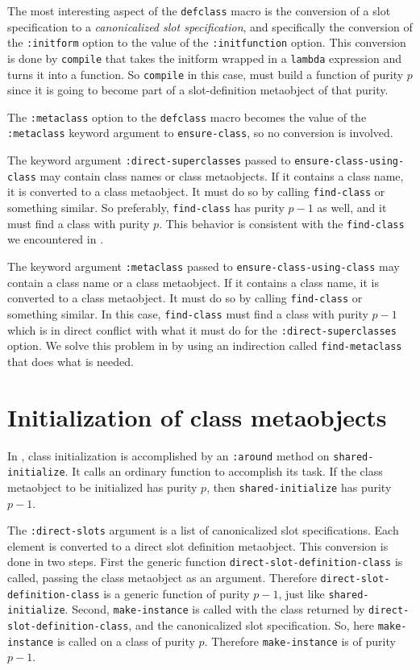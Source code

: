 The most interesting aspect of the \texttt{defclass} macro is the
conversion of a slot specification to a \emph{canonicalized slot
  specification}, and specifically the conversion of the
\texttt{:initform} option to the value of the \texttt{:initfunction}
option.  This conversion is done by \texttt{compile} that takes the
initform wrapped in a \texttt{lambda} expression and turns it into a
function.  So \texttt{compile} in this case, must build a function of
purity $p$ since it is going to become part of a slot-definition
metaobject of that purity.

The \texttt{:metaclass} option to the \texttt{defclass} macro becomes
the value of the \texttt{:metaclass} keyword argument to
\texttt{ensure-class}, so no conversion is involved.

The keyword argument \texttt{:direct-superclasses} passed to
\texttt{ensure-class-using-class} may contain class names or class
metaobjects.  If it contains a class name, it is converted to a class
metaobject.  It must do so by calling \texttt{find-class} or something
similar.  So preferably, \texttt{find-class} has purity $p-1$ as well,
and it must find a class with purity $p$.  This behavior is consistent
with the \texttt{find-class} we encountered in
.

The keyword argument \texttt{:metaclass} passed to
\texttt{ensure-class-using-class} may contain a class name or a class
metaobject.  If it contains a class name, it is converted to a class
metaobject.  It must do so by calling \texttt{find-class} or something
similar.  In this case, \texttt{find-class} must find a class with
purity $p-1$ which is in direct conflict with what it must do for the
\texttt{:direct-superclasses} option.  We solve this problem in
\sysname{} by using an indirection called \texttt{find-metaclass} that
does what is needed.

\section{Initialization of class metaobjects}

In \sysname{}, class initialization is accomplished by an
\texttt{:around} method on \texttt{shared-initialize}.  It calls an
ordinary function to accomplish its task.  If the class metaobject to
be initialized has purity $p$, then \texttt{shared-initialize} has
purity $p-1$.

The \texttt{:direct-slots} argument is a list of canonicalized slot
specifications.  Each element is converted to a direct slot definition
metaobject.  This conversion is done in two steps.  First the generic
function \texttt{direct-slot-definition-class} is called, passing the
class metaobject as an argument.  Therefore
\texttt{direct-slot-definition-class} is a generic function of purity
$p-1$, just like \texttt{shared-initialize}.  Second,
\texttt{make-instance} is called with the class returned by
\texttt{direct-slot-definition-class}, and the canonicalized
slot specification.  So, here \texttt{make-instance} is called on a
class of purity $p$.  Therefore \texttt{make-instance} is of purity
$p-1$.


